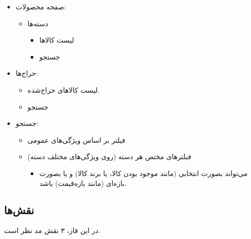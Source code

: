 \documentclass[]{article}
\begin{document}
\begin{itemize}
\item
صفحه محصولات:

\begin{itemize}
\item
دسته‌‌ها 

\begin{itemize}[label={$\blacksquare$}]
\item
لیست کالاها

\item
جستجو

\end{itemize}
\end{itemize}

\newpage
\item
حراج‌ها:

\begin{itemize}
\item
لیست کالاهای حراج‌شده.

\item
جستجو
\end{itemize}

\item
جستجو:

\begin{itemize}
\item
فیلتر بر اساس ویژگی‌های عمومی

\item
فیلترهای مختص هر دسته (روی ویژگی‌های مختلف دسته)

\begin{itemize}[label={$\blacksquare$}]
\item
می‌تواند بصورت انتخابی (مانند موجود بودن کالا، یا برند کالا) و یا بصورت بازه‌ای (مانند بازه‌قیمت) باشد.
\end{itemize}
\end{itemize}

\end{itemize}

\newpage

\subsection*{{\titr نقش‌ها}}

در این فاز، ۳ نقش مد نظر است.
\end{document}
